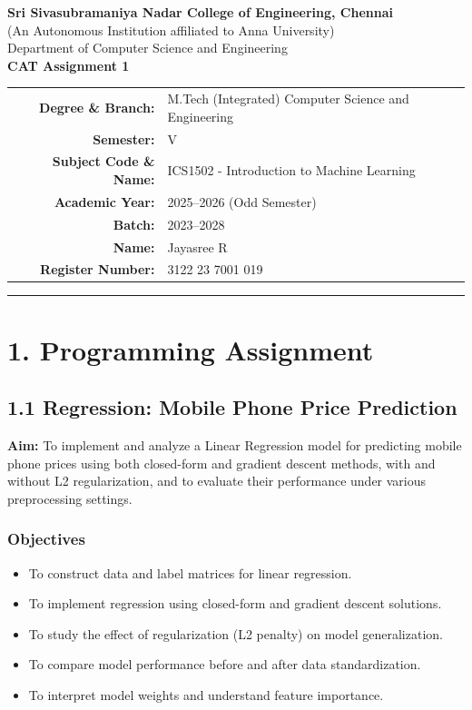 \documentclass[a4paper,12pt]{article}
\begin{document}
\begin{center}
     \textbf{Sri Sivasubramaniya Nadar College of Engineering, Chennai}\\
    (An Autonomous Institution affiliated to Anna University)\\[4pt]
     Department of Computer Science and Engineering\\[8pt]
    \textbf{CAT Assignment 1}\\[10pt]
\end{center}
    \begin{tabular}{rl}
        \textbf{Degree \& Branch:} & M.Tech (Integrated) Computer Science and Engineering \\
        \textbf{Semester:} & V \\
        \textbf{Subject Code \& Name:} & ICS1502 - Introduction to Machine Learning \\
        \textbf{Academic Year:} & 2025–2026 (Odd Semester) \\
        \textbf{Batch:} & 2023–2028 \\
        \textbf{Name:} & Jayasree R \\
        \textbf{Register Number:} & 3122 23 7001 019 \\
    \end{tabular}

\vspace{0.5cm}
\hrule
\vspace{0.5cm}

\section*{1. Programming Assignment}

\subsection*{1.1 Regression: Mobile Phone Price Prediction}
\textbf{Aim:} To implement and analyze a Linear Regression model for predicting mobile phone prices using both closed-form and gradient descent methods, with and without L2 regularization, and to evaluate their performance under various preprocessing settings.

\subsubsection*{Objectives}
\begin{itemize}
    \item To construct data and label matrices for linear regression.
    \item To implement regression using closed-form and gradient descent solutions.
    \item To study the effect of regularization (L2 penalty) on model generalization.
    \item To compare model performance before and after data standardization.
    \item To interpret model weights and understand feature importance.
\end{itemize}
\end{document}
